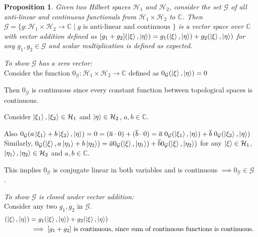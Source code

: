 \documentclass[12pt,twoside,fleqn]{report}
\makeatletter
\theoremstyle{thmstyle}
\renewenvironment{proof}[1][\proofname]{\par
\pushQED{\qed}%
\normalfont \topsep6\p@\@plus6\p@\relax
\trivlist
\item[\hskip\labelsep\itshape#1\@addpunct{.}]\mbox{}\par\nobreak\ignorespaces
}{%
    \popQED\endtrivlist\@endpefalse
    }
\newtheorem{prop}{Proposition}[chapter]
\makeatother
\begin{document}
\begin{prop}
    Given two Hilbert spaces $\mathcal{H}_1$ and $\mathcal{H}_2$, consider the set $\mathcal{G}$ of all anti-linear and continuous functionals from $\mathcal{H}_1 \times \mathcal{H}_2$ to $\mathbb{C}$.
    Then $\mathcal{G} = \{ g: \mathcal{H}_1 \times \mathcal{H}_2 \to \mathbb{C} \; | \; g \text{ is anti-linear and continuous } \}$ is a vector space over $\mathbb{C}$ with vector addition defined as $[ g_1 + g_2] (\ket{\xi}, \ket{\eta}) = g_1(\ket{\xi}, \ket{\eta}) + g_2(\ket{\xi}, \ket{\eta})$ for any $g_1, g_2 \in \mathcal{G}$ and scalar multiplication is defined as expected.
\end{prop}
\begin{proof}
    \emph{To show $\mathcal{G}$ has a zero vector:} \\

    Consider the function $0_\mathcal{G}: \mathcal{H}_1 \times \mathcal{H}_2 \to \mathbb{C}$ defined as $0_\mathcal{G}(\ket{\xi}, \ket{\eta}) = 0$

    Then $0_\mathcal{G}$ is continuous since every constant function between topological spaces is continuous.

    Consider $\ket{\xi_1}, \ket{\xi_2} \in \mathcal{H}_1$ and $\ket{\eta} \in \mathcal{H}_2$, $a,b \in \mathbb{C}$.

    Also $0_\mathcal{G}(a \ket{\xi_1} + b \ket{\xi_2}, \ket{\eta}) = 0 = (\overline{a} \cdot 0 ) + (\overline{b} \cdot 0) = \overline{a} \; 0_\mathcal{G}(\ket{\xi_1}, \ket{\eta}) + \overline{b} \; 0_\mathcal{G} (\ket{\xi_2}, \ket{\eta}) $
    Similarly, $0_\mathcal{G}(\ket{\xi}, a \ket{\eta_1} + b \ket{\eta_2}) = \overline{a} 0_\mathcal{G}(\ket{\xi}, \ket{\eta_1}) + \overline{b} 0_\mathcal{G}(\ket{\xi}, \ket{\eta_2})$ for any $\ket{\xi} \in \mathcal{H}_1$, $\ket{\eta_1}, \ket{\eta_2} \in \mathcal{H}_2$ and $a,b \in \mathbb{C}$.

    This implies $0_\mathcal{G}$ is conjugate linear in both variables and is continuous $\implies 0_\mathcal{G} \in \mathcal{G}$ .

    \emph{To show $\mathcal{G}$ is closed under vector addition:}\\

    Consider any two $g_1, g_2$ in $\mathcal{G}$.
    \begin{align*}
        [g_1 + g_2](\ket\xi, \ket\eta) & = g_1(\ket\xi, \ket\eta) + g_2(\ket\xi, \ket\eta)
        \\ & \implies [g_1 + g_2] \text{ is continuous, since sum of continuous functions is continuous.}
    \end{align*}


\end{proof}
\end{document}
